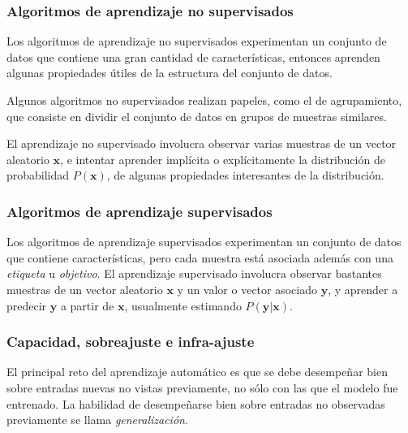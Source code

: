 \subsubsection{Algoritmos de aprendizaje no supervisados}

\begin{remark}
Los algoritmos de aprendizaje no supervisados experimentan un conjunto
de datos que contiene una gran cantidad de características, entonces aprenden algunas
propiedades útiles de la estructura del conjunto de datos. 
\end{remark}

Algunos
algoritmos no supervisados realizan papeles, como el de agrupamiento,
que consiste en dividir el conjunto de datos en grupos de muestras
similares.\\

\begin{remark}
El aprendizaje no supervisado involucra observar
varias muestras de un vector aleatorio $\mathbf{x}$, e intentar aprender implícita
o explícitamente la distribución de probabilidad $P(\mathbf{x})$, de algunas
propiedades interesantes de la distribución.
\end{remark}


\subsubsection{Algoritmos de aprendizaje
supervisados}

\begin{remark}
Los algoritmos de aprendizaje supervisados experimentan un conjunto de
datos que contiene características, pero cada muestra está asociada además con
una \textit{etiqueta} u \textit{objetivo}.
El aprendizaje supervisado involucra observar bastantes muestras de un
vector aleatorio $\mathbf{x}$ y un valor o vector asociado $\mathbf{y}$, y aprender a
predecir $\mathbf{y}$ a partir de $\mathbf{x}$, usualmente estimando $P(\mathbf{y} |\mathbf{x})$.
\end{remark}



\subsubsection{Capacidad, sobreajuste e
infra-ajuste}

El principal reto del aprendizaje automático es que se debe desempeñar
bien sobre entradas nuevas no vistas previamente, no sólo con las que el
modelo fue entrenado. La habilidad de desempeñarse bien sobre entradas
no observadas previamente se llama \textit{generalización}.

